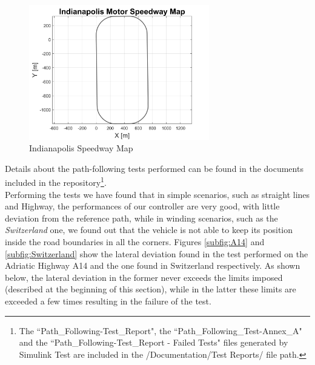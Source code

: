 \begin{enumerate}
    \begin{figure}[H]
    \centering
    \includegraphics[width=0.7\textwidth]{Figures/IndianapolisMap.png}
    \caption{Indianapolis Speedway Map}
      \label{fig:Indianapolis}
\end{figure}
\end{enumerate}

\pagebreak
Details about the path-following tests performed can be found in the documents included in the repository\footnote{The ``Path\_Following-Test\_Report", the ``Path\_Following\_Test-Annex\_A" and the ``Path\_Following-Test\_Report - Failed Tests" files generated by Simulink Test are included in the /Documentation/Test Reports/ file path.}.\\
Performing the tests we have found that in simple scenarios, such as straight lines and Highway, the performances of our controller are very good, with little deviation from the reference path, while in winding scenarios, such as the \textit{Switzerland} one, we found out that the vehicle is not able to keep its position inside the road boundaries in all the corners.
Figures \ref{subfig:A14} and \ref{subfig:Switzerland} show the lateral deviation found in the test performed on the Adriatic Highway A14 and the one found in Switzerland respectively. As shown below, the lateral deviation in the former never exceeds the limits imposed (described at the beginning of this section), while in the latter these limits are exceeded a few times resulting in the failure of the test.


